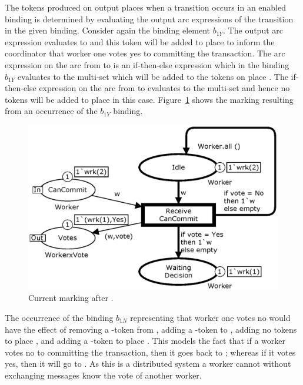 
The tokens produced on output places when a transition occurs in an
enabled binding is determined by evaluating the output arc expressions
of the transition in the given binding. Consider again the binding
element $b_{1Y}$. The output arc expression 
evaluates to  and this token will be added to
place  to inform the coordinator that worker one votes
yes to committing the transaction. The arc expression on the arc from
 to  is an
if-then-else expression which in the binding $b_{1Y}$ evaluates to the
multi-set  which will be added to the tokens on
place . The if-then-else expression on the
arc from  to  evaluates to the
 multi-set and hence no tokens will be added to place
 in this case. Figure~\ref{fig:receivecancommit} shows
the marking resulting from an occurrence of the $b_{1Y}$ binding.

\begin{figure}[b]
\centering
\includegraphics[scale=.45]{figures/ReceiveCanCommit.eps}
\caption{Current marking after .}
\label{fig:receivecancommit}
\end{figure}

The occurrence of the binding $b_{1N}$ representing that worker one
votes no would have the effect of removing a -token
from , adding a -token to
, adding no tokens to place ,
and adding a -token to place . This
models the fact that if a worker votes no to committing the
transaction, then it goes back to ; whereas if it votes
yes, then it will go to .  As this is a
distributed system a worker cannot without exchanging messages know
the vote of another worker.

